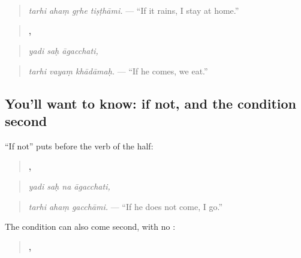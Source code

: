 \begin{quote}
\textbf{   }
\end{quote}

\begin{quote}
\emph{tarhi ahaṃ gṛhe tiṣṭhāmi.} — \textquotedblleft{}If it rains, I stay at home.\textquotedblright{}
\end{quote}

\begin{quote}
\textbf{  ,}
\end{quote}

\begin{quote}
\emph{yadi saḥ āgacchati,}
\end{quote}

\begin{quote}
\textbf{  }
\end{quote}

\begin{quote}
\emph{tarhi vayaṃ khādāmaḥ.} — \textquotedblleft{}If he comes, we eat.\textquotedblright{}
\end{quote}

\subsection*{You'll want to know: if not, and the condition second}
\textquotedblleft{}If not\textquotedblright{} puts \textbf{} before the verb of the \textbf{} half:

\begin{quote}
\textbf{   ,}
\end{quote}

\begin{quote}
\emph{yadi saḥ na āgacchati,}
\end{quote}

\begin{quote}
\textbf{  }
\end{quote}

\begin{quote}
\emph{tarhi ahaṃ gacchāmi.} — \textquotedblleft{}If he does not come, I go.\textquotedblright{}
\end{quote}

The condition can also come second, with no \textbf{}:

\begin{quote}
\textbf{ ,    }
\end{quote}

